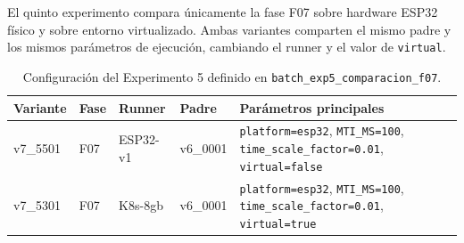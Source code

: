 El quinto experimento compara únicamente la fase F07 sobre hardware ESP32 físico y sobre entorno virtualizado. Ambas variantes comparten el mismo padre y los mismos parámetros de ejecución, cambiando el runner y el valor de \texttt{virtual}.

\begin{table}[htbp]
    \centering
    \caption{Configuración del Experimento 5 definido en \texttt{batch\_exp5\_comparacion\_f07}.}
    \label{tab:params-exp5-comparacion-f07}
    \begin{tabular}{p{}p{}p{}p{}p{}}
        \hline
        \textbf{Variante} & \textbf{Fase} & \textbf{Runner} & \textbf{Padre} & \textbf{Parámetros principales} \\
        \hline
        v7\_5501 & F07 & ESP32-v1 & v6\_0001 & \texttt{platform=esp32}, \texttt{MTI\_MS=100}, \texttt{time\_scale\_factor=0.01}, \texttt{virtual=false} \\
        v7\_5301 & F07 & K8s-8gb & v6\_0001 & \texttt{platform=esp32}, \texttt{MTI\_MS=100}, \texttt{time\_scale\_factor=0.01}, \texttt{virtual=true} \\
        \hline
    \end{tabular}
\end{table}
